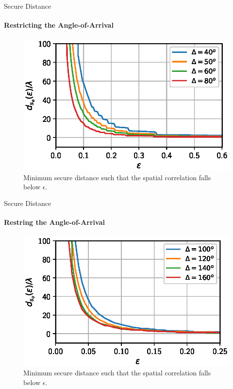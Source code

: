 \begin{frame}{Secure Distance}
\framesubtitle{Restricting the Angle-of-Arrival}
\begin{figure}
    \centering
    \includegraphics[scale = 0.9]{figures/key_generation_and_spatial_seperation/securedistDelta80zoom.eps}
    \caption{ Minimum secure distance such that the spatial correlation falls below $\epsilon$.}
\end{figure}
\end{frame}

\begin{frame}{Secure Distance}
\framesubtitle{Restring the Angle-of-Arrival}
\begin{figure}
    \centering
    \includegraphics[scale = 0.9]{figures/key_generation_and_spatial_seperation/securedistDelta160zoom.eps}
    \caption{ Minimum secure distance such that the spatial correlation falls below $\epsilon$.}
    \label{fig:enter-label}
\end{figure}
\end{frame}

